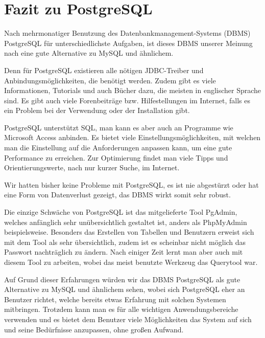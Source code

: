 \section{Fazit zu PostgreSQL}
Nach mehrmonatiger Benutzung des Datenbankmanagement-Systems (DBMS) PostgreSQL für 
unterschiedlichste Aufgaben, ist dieses DBMS unserer Meinung nach eine gute Alternative zu MySQL 
und ähnlichem. 

Denn für PostgreSQL existieren alle nötigen JDBC-Treiber und Anbindungsmöglichkeiten, die benötigt 
werden. Zudem gibt es viele Informationen, Tutorials und auch Bücher dazu, die meisten in englischer 
Sprache sind. Es gibt auch viele Forenbeiträge bzw. Hilfestellungen im Internet,
falls es ein Problem bei der Verwendung oder der Installation gibt.

PostgreSQL unterstützt SQL, man kann es aber auch an Programme wie Microsoft Access anbinden. Es 
bietet viele Einstellungsmöglichkeiten, mit welchen man die Einstellung auf die Anforderungen 
anpassen kann, um eine gute Performance zu erreichen. Zur Optimierung findet man viele Tipps und 
Orientierungswerte, nach nur kurzer Suche, im Internet.

Wir hatten bisher keine Probleme mit PostgreSQL, es ist nie abgestürzt oder hat eine Form von 
Datenverlust gezeigt, das DBMS wirkt somit sehr robust.

Die einzige Schwäche von PostgreSQL ist das mitgelieferte Tool PgAdmin, welches anfänglich sehr 
unübersichtlich gestaltet ist, anders als PhpMyAdmin beispielsweise. Besonders das Erstellen von 
Tabellen und Benutzern erweist sich mit dem Tool als sehr übersichtlich, zudem ist es scheinbar 
nicht möglich das Passwort nachträglich zu ändern. Nach einiger Zeit lernt man aber auch mit diesem 
Tool zu arbeiten, wobei das meist benutzte Werkzeug das Querytool war.
   
Auf Grund dieser Erfahrungen würden wir das DBMS PostgreSQL als gute Alternative zu MySQL und 
ähnlichem sehen, wobei sich PostgreSQL eher an Benutzer richtet, welche bereits etwas Erfahrung mit 
solchen Systemen mitbringen. Trotzdem kann man es für alle wichtigen Anwendungsbereiche verwenden 
und es bietet dem Benutzer viele Möglichkeiten das System auf sich und seine Bedürfnisse anzupassen, 
ohne großen Aufwand.


\clearpage